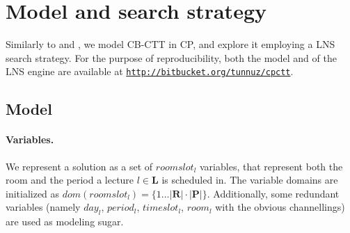 \documentclass{llncs}
\begin{document}
\vspace{-0.05cm}

\section{Model and search strategy}\label{sec:search}

Similarly to \cite{CHOP08} and \cite{CiDD12}, we model CB-CTT in CP, and explore it employing a LNS \cite{Pisinger2010} search strategy. For the purpose of reproducibility, both the model and of the LNS engine are available at \texttt{\href{http://bitbucket.org/tunnuz/cpctt}{http://bitbucket.org/tunnuz/cpctt}}.

\subsection{Model}

\paragraph{Variables.} We represent a solution as a set of $roomslot_l$ variables, that represent both the room and the period a lecture $l \in \mathbf{L}$ is scheduled in. The variable domains are initialized as $dom(roomslot_l) = \{1\dots|\mathbf{R}|\cdot|\mathbf{P}|\}$. Additionally, some redundant variables (namely $day_l$, $period_l$, $timeslot_l$, $room_l$ with the obvious channellings) are used as modeling sugar.
\end{document}
